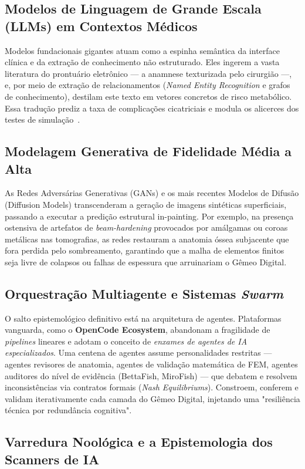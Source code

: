 \subsection{Modelos de Linguagem de Grande Escala (LLMs) em Contextos Médicos}
Modelos fundacionais gigantes atuam como a espinha semântica da interface clínica e da extração de conhecimento não estruturado. Eles ingerem a vasta literatura do prontuário eletrônico — a anamnese texturizada pelo cirurgião —, e, por meio de extração de relacionamentos (\textit{Named Entity Recognition} e grafos de conhecimento), destilam este texto em vetores concretos de risco metabólico. Essa tradução prediz a taxa de complicações cicatriciais e modula os alicerces dos testes de simulação~\cite{mdpi2025digital}.

\subsection{Modelagem Generativa de Fidelidade Média a Alta}
As Redes Adversárias Generativas (GANs) e os mais recentes Modelos de Difusão (Diffusion Models) transcenderam a geração de imagens sintéticas superficiais, passando a executar a predição estrutural in-painting. Por exemplo, na presença ostensiva de artefatos de \textit{beam-hardening} provocados por amálgamas ou coroas metálicas nas tomografias, as redes restauram a anatomia óssea subjacente que fora perdida pelo sombreamento, garantindo que a malha de elementos finitos seja livre de colapsos ou falhas de espessura que arruinariam o Gêmeo Digital.

\subsection{Orquestração Multiagente e Sistemas \textit{Swarm}}
O salto epistemológico definitivo está na arquitetura de agentes. Plataformas vanguarda, como o \textbf{OpenCode Ecosystem}, abandonam a fragilidade de \textit{pipelines} lineares e adotam o conceito de \textit{enxames de agentes de IA especializados}. Uma centena de agentes assume personalidades restritas — agentes revisores de anatomia, agentes de validação matemática de FEM, agentes auditores do nível de evidência (BettaFish, MiroFish) — que debatem e resolvem inconsistências via contratos formais (\textit{Nash Equilibriums}). Constroem, conferem e validam iterativamente cada camada do Gêmeo Digital, injetando uma "resiliência técnica por redundância cognitiva".

\subsection{Varredura Noológica e a Epistemologia dos Scanners de IA}

